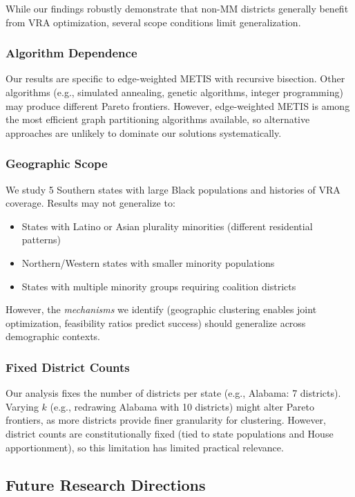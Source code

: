 While our findings robustly demonstrate that non-MM districts generally benefit from VRA optimization, several scope conditions limit generalization.

\subsubsection{Algorithm Dependence}

Our results are specific to edge-weighted METIS with recursive bisection. Other algorithms (e.g., simulated annealing, genetic algorithms, integer programming) may produce different Pareto frontiers. However, edge-weighted METIS is among the most efficient graph partitioning algorithms available, so alternative approaches are unlikely to dominate our solutions systematically.

\subsubsection{Geographic Scope}

We study 5 Southern states with large Black populations and histories of VRA coverage. Results may not generalize to:
\begin{itemize}
    \item States with Latino or Asian plurality minorities (different residential patterns)
    \item Northern/Western states with smaller minority populations
    \item States with multiple minority groups requiring coalition districts
\end{itemize}

However, the \emph{mechanisms} we identify (geographic clustering enables joint optimization, feasibility ratios predict success) should generalize across demographic contexts.

\subsubsection{Fixed District Counts}

Our analysis fixes the number of districts per state (e.g., Alabama: 7 districts). Varying $k$ (e.g., redrawing Alabama with 10 districts) might alter Pareto frontiers, as more districts provide finer granularity for clustering. However, district counts are constitutionally fixed (tied to state populations and House apportionment), so this limitation has limited practical relevance.

\subsection{Future Research Directions}

